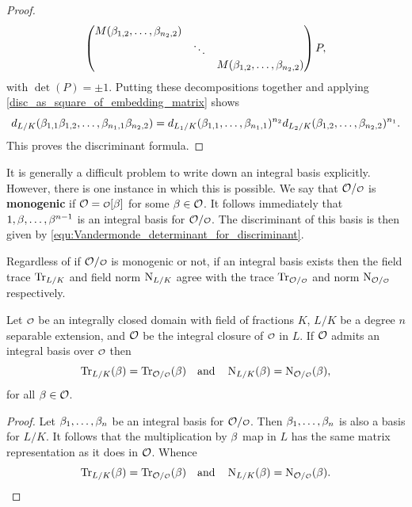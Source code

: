 \begin{proof}
      \[
        \begin{pmatrix} M(\beta_{1,2},\ldots,\beta_{n_{2},2}) & & \\ & \ddots & \\ & & M(\beta_{1,2},\ldots,\beta_{n_{2},2}) \end{pmatrix}P,
      \]
      with \(\det(P) = \pm 1\). Putting these decompositions together and applying \cref{disc_as_square_of_embedding_matrix} shows
      \[
        d_{L/K}(\beta_{1,1}\beta_{1,2},\ldots,\beta_{n_{1},1}\beta_{n_{2},2}) = d_{L_{1}/K}(\beta_{1,1},\ldots,\beta_{n_{1},1})^{n_{2}}d_{L_{2}/K}(\beta_{1,2},\ldots,\beta_{n_{2},2})^{n_{1}}.
      \]
      This proves the discriminant formula.
    \end{proof}

    It is generally a difficult problem to write down an integral basis explicitly. However, there is one instance in which this is possible. We say that \(\mc{O}/\smc{O}\) is \textbf{monogenic} if \(\mc{O} =\smc{O}[\b]\) for some \(\beta \in \mathcal{O}\). It follows immediately that \(1,\beta,\ldots,\beta^{n-1}\) is an integral basis for \(\mc{O}/\smc{O}\). The discriminant of this basis is then given by \cref{equ:Vandermonde_determinant_for_discriminant}.
    
    Regardless of if \(\mc{O}/\smc{O}\) is monogenic or not, if an integral basis exists then the field trace \(\operatorname{\mathrm{Tr}}_{L/K}\) and field norm \(\operatorname{\mathrm{N}}_{L/K}\) agree with the trace \(\Trace_{\mc{O}/\smc{O}}\) and norm \(\Norm_{\mc{O}/\smc{O}}\) respectively.

    \begin{proposition}\label{prop:trace_and_norm_reduce_for_integral_basis}
      Let \(\smc{O}\) be an integrally closed domain with field of fractions \(K\), \(L/K\) be a degree \(n\) separable extension, and \(\mathcal{O}\) be the integral closure of \(\smc{O}\) in \(L\). If \(\mathcal{O}\) admits an integral basis over \(\smc{O}\) then
      \[
        \Trace_{L/K}(\b) = \Trace_{\mc{O}/\smc{O}}(\b) \quad \text{and} \quad \Norm_{L/K}(\b) = \Norm_{\mc{O}/\smc{O}}(\b),
      \]
      for all \(\beta \in \mathcal{O}\).
    \end{proposition}
    \begin{proof}
      Let \(\beta_{1},\ldots,\beta_{n}\) be an integral basis for \(\mc{O}/\smc{O}\). Then \(\beta_{1},\ldots,\beta_{n}\) is also a basis for \(L/K\). It follows that the multiplication by \(\beta\) map in \(L\) has the same matrix representation as it does in \(\mathcal{O}\). Whence
      \[
        \Trace_{L/K}(\b) = \Trace_{\mc{O}/\smc{O}}(\b) \quad \text{and} \quad \Norm_{L/K}(\b) = \Norm_{\mc{O}/\smc{O}}(\b).
      \]
    \end{proof}

